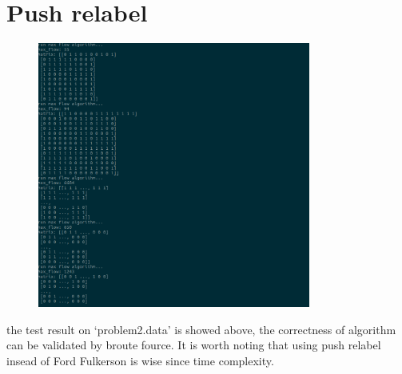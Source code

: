\section{Push relabel}
 
\begin{figure}[H]
 \centering 
	\includegraphics[width = 0.8\textwidth,height = 0.25\textheight]{work5/push1}
\end{figure} 	
the test result on `problem2.data' is showed above,
 the correctness of algorithm can be validated by broute fource.
 It is worth noting that using push relabel insead of Ford Fulkerson 
 is wise since time complexity.